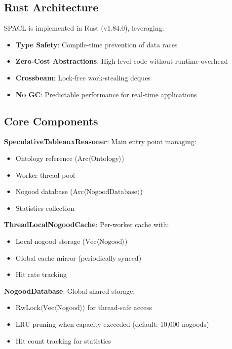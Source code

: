 \documentclass[preprint,12pt]{elsarticle}
\begin{document}
\subsection{Rust Architecture}
\label{sec:rust}

SPACL is implemented in Rust (v1.84.0), leveraging:

\begin{itemize}
    \item \textbf{Type Safety}: Compile-time prevention of data races
    \item \textbf{Zero-Cost Abstractions}: High-level code without runtime overhead
    \item \textbf{Crossbeam}: Lock-free work-stealing deques \cite{crossbeam}
    \item \textbf{No GC}: Predictable performance for real-time applications
\end{itemize}

\subsection{Core Components}
\label{sec:components}

\textbf{SpeculativeTableauxReasoner}: Main entry point managing:
\begin{itemize}
    \item Ontology reference ($\text{Arc}\langle\text{Ontology}\rangle$)
    \item Worker thread pool
    \item Nogood database ($\text{Arc}\langle\text{NogoodDatabase}\rangle$)
    \item Statistics collection
\end{itemize}

\textbf{ThreadLocalNogoodCache}: Per-worker cache with:
\begin{itemize}
    \item Local nogood storage ($\text{Vec}\langle\text{Nogood}\rangle$)
    \item Global cache mirror (periodically synced)
    \item Hit rate tracking
\end{itemize}

\textbf{NogoodDatabase}: Global shared storage:
\begin{itemize}
    \item $\text{RwLock}\langle\text{Vec}\langle\text{Nogood}\rangle\rangle$ for thread-safe access
    \item LRU pruning when capacity exceeded (default: 10,000 nogoods)
    \item Hit count tracking for statistics
\end{itemize}
\end{document}
